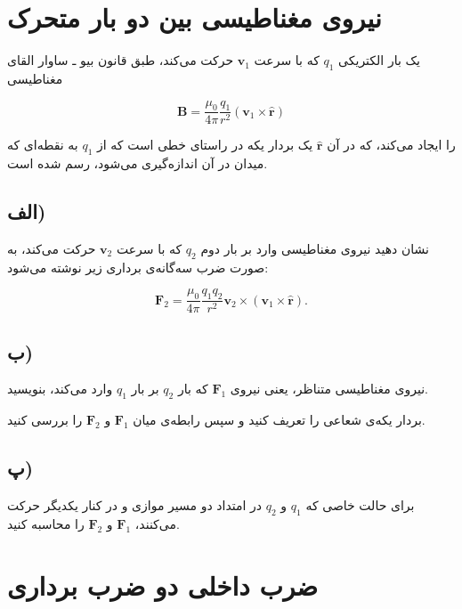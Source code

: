 \documentclass[a4paper,16pt]{article}
\begin{document}

\section{نیروی مغناطیسی بین دو بار متحرک}

یک بار الکتریکی $q_1$ که با سرعت $\mathbf{v}_1$ حرکت می‌کند، طبق قانون بیو ـ ساوار القای مغناطیسی

\[
\mathbf{B}
=
\frac{\mu_0}{4\pi}
\frac{q_1}{r^2}
\left(
\mathbf{v}_1\times\hat{\mathbf r}
\right)
\]

را ایجاد می‌کند، که در آن $\hat{\mathbf r}$ یک بردار یکه در راستای خطی است که از $q_1$ به نقطه‌ای که میدان در آن اندازه‌گیری می‌شود، رسم شده است.

\subsection*{الف)}

نشان دهید نیروی مغناطیسی وارد بر بار دوم $q_2$ که با سرعت $\mathbf{v}_2$ حرکت می‌کند، به صورت ضرب سه‌گانه‌ی برداری زیر نوشته می‌شود:

\[
\mathbf{F}_2
=
\frac{\mu_0}{4\pi}
\frac{q_1q_2}{r^2}
\mathbf{v}_2
\times
\left(
\mathbf{v}_1\times\hat{\mathbf r}
\right).
\]

\subsection*{ب)}

نیروی مغناطیسی متناظر، یعنی نیروی $\mathbf{F}_1$ که بار $q_2$ بر بار $q_1$ وارد می‌کند، بنویسید.

بردار یکه‌ی شعاعی را تعریف کنید و سپس رابطه‌ی میان $\mathbf{F}_1$ و $\mathbf{F}_2$ را بررسی کنید.

\subsection*{پ)}

برای حالت خاصی که $q_1$ و $q_2$ در امتداد دو مسیر موازی و در کنار یکدیگر حرکت می‌کنند، $\mathbf{F}_1$ و $\mathbf{F}_2$ را محاسبه کنید.



\section{ضرب داخلی دو ضرب برداری}
\end{document}
